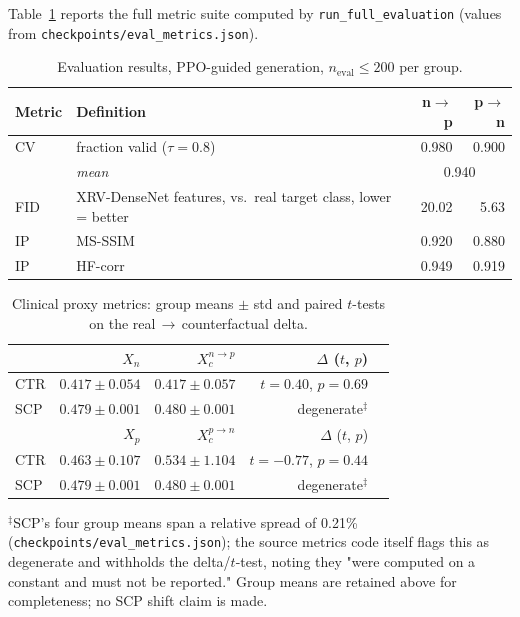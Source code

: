 \documentclass[11pt]{article}
\begin{document}
Table~\ref{tab:results} reports the full metric suite computed by
\texttt{run\_full\_evaluation} (values from
\texttt{checkpoints/}\allowbreak\texttt{eval\_metrics.json}).

\begin{table}[h]
\centering
\caption{Evaluation results, PPO-guided generation, $n_{\text{eval}} \le 200$ per group.}
\label{tab:results}
\begin{tabular}{@{}llrr@{}}
\toprule
\textbf{Metric} & \textbf{Definition} & \textbf{n$\to$p} & \textbf{p$\to$n} \\
\midrule
CV      & fraction valid ($\tau=0.8$)               & 0.980  & 0.900 \\
        & \textit{mean}                              & \multicolumn{2}{c}{0.940} \\
FID     & XRV-DenseNet features, vs.\ real target class, lower = better & 20.02 & 5.63 \\
IP      & MS-SSIM                                     & 0.920  & 0.880 \\
IP      & HF-corr                                     & 0.949  & 0.919 \\
\bottomrule
\end{tabular}
\end{table}

\begin{table}[h]
\centering
\caption{Clinical proxy metrics: group means $\pm$ std and paired $t$-tests
on the real$\,\to\,$counterfactual delta.}
\label{tab:clinical}
\begin{tabular}{@{}lrrrr@{}}
\toprule
& \textbf{$X_n$} & \textbf{$X_c^{n\to p}$} & $\Delta$ ($t$, $p$) & \\
\midrule
CTR & $0.417 \pm 0.054$ & $0.417 \pm 0.057$ & $t=0.40$, $p=0.69$ & \\
SCP & $0.479 \pm 0.001$ & $0.480 \pm 0.001$ & degenerate$^{\ddagger}$ & \\
\midrule
& \textbf{$X_p$} & \textbf{$X_c^{p\to n}$} & $\Delta$ ($t$, $p$) & \\
\midrule
CTR & $0.463 \pm 0.107$ & $0.534 \pm 1.104$ & $t=-0.77$, $p=0.44$ & \\
SCP & $0.479 \pm 0.001$ & $0.480 \pm 0.001$ & degenerate$^{\ddagger}$ & \\
\bottomrule
\end{tabular}

\vspace{0.3em}
\footnotesize$^{\ddagger}$SCP's four group means span a relative spread
of 0.21\% (\texttt{checkpoints/eval\_metrics.json}); the source metrics
code itself flags this as degenerate and withholds the delta/$t$-test,
noting they "were computed on a constant and must not be reported." Group
means are retained above for completeness; no SCP shift claim is made.
\end{table}
\end{document}
